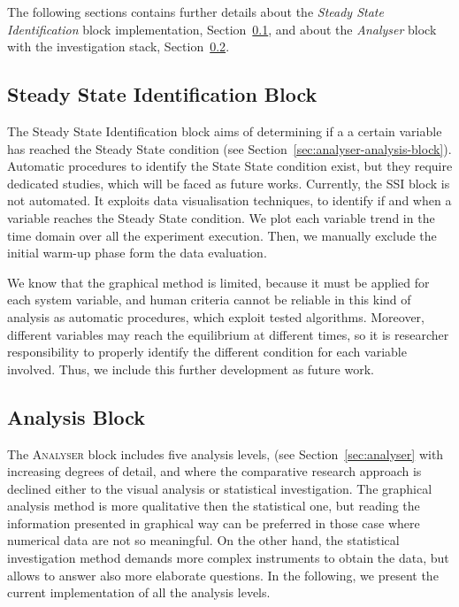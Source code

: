 The following sections contains further details about the \textit{Steady State Identification} block implementation, Section~\ref{sec:analyser-impl-ss-block}, and about the \textit{Analyser} block with the investigation stack, Section~\ref{sec:analyser-impl-analysis-block}.

\subsection{Steady State Identification Block}\label{sec:analyser-impl-ss-block}

The Steady State Identification block aims of determining if a a certain variable has reached the Steady State condition (see Section~\ref{sec:analyser-analysis-block}). Automatic procedures to identify the State State condition exist, but they require dedicated studies, which will be faced as future works. Currently, the SSI block is not automated. It exploits data visualisation techniques, to identify if and when a variable reaches the Steady State condition. We plot each variable trend in the time domain over all the experiment execution. Then, we manually exclude the initial warm-up phase form the data evaluation.

We know that the graphical method is limited, because it must be applied for each system variable, and human criteria cannot be reliable in this kind of analysis as automatic procedures, which exploit tested algorithms. Moreover, different variables may reach the equilibrium at different times, so it is researcher responsibility to properly identify the different condition for each variable involved. Thus, we include this further development as future work.

\subsection{Analysis Block}\label{sec:analyser-impl-analysis-block}

\noindent The \textsc{Analyser} block includes five analysis levels, (see Section~\ref{sec:analyser} with increasing degrees of detail, and where the comparative research approach is declined either to the visual analysis or statistical investigation. The graphical analysis method is more qualitative then the statistical one, but reading the information presented in graphical way can be preferred in those case where numerical data are not so meaningful. On the other hand, the statistical investigation method demands more complex instruments to obtain the data, but allows to answer also more elaborate questions. In the following, we present the current implementation of all the analysis levels.

